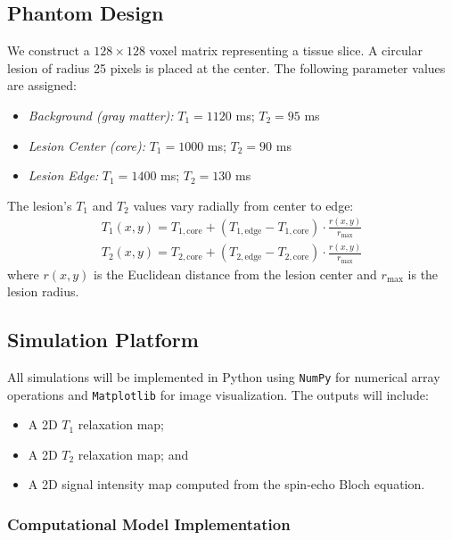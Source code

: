 \documentclass[10pt,a4paper,twoside]{article}
\begin{document}
\subsection{Phantom Design}

We construct a \(128 \times 128\) voxel matrix representing a tissue slice. A circular lesion of radius 25 pixels is placed at the center. The following parameter values are assigned:

\begin{itemize}
    \item \textit{Background (gray matter):} \(T_1 = 1120\) ms; \(T_2 = 95\) ms
    \item \textit{Lesion Center (core):} \(T_1 = 1000\) ms; \(T_2 = 90\) ms
    \item \textit{Lesion Edge:} \(T_1 = 1400\) ms; \(T_2 = 130\) ms
\end{itemize}

\noindent The lesion's \(T_1\) and \(T_2\) values vary radially from center to edge:
\begin{align}
    T_1(x, y) = T_{1,\text{core}} + \left( T_{1,\text{edge}} - T_{1,\text{core}} \right) \cdot \frac{r(x, y)}{r_{\max}} \\
    T_2(x, y) = T_{2,\text{core}} + \left( T_{2,\text{edge}} - T_{2,\text{core}} \right) \cdot \frac{r(x, y)}{r_{\max}}
\end{align}
where \( r(x, y) \) is the Euclidean distance from the lesion center and \( r_{\max} \) is the lesion radius.

\subsection{Simulation Platform}

All simulations will be implemented in Python using \texttt{NumPy} for numerical array operations and \texttt{Matplotlib} for image visualization. The outputs will include:
\begin{itemize}
    \item A 2D \(T_1\) relaxation map;
    \item A 2D \(T_2\) relaxation map; and
    \item A 2D signal intensity map computed from the spin-echo Bloch equation.
\end{itemize}

\subsubsection{Computational Model Implementation}
\end{document}
